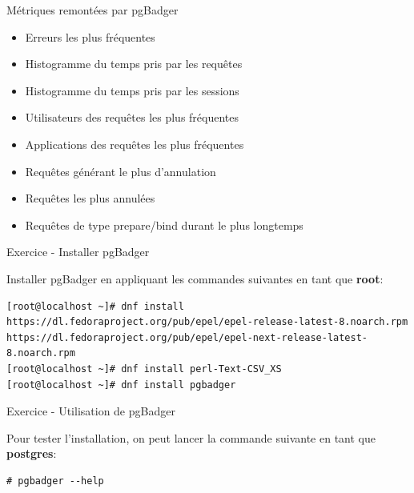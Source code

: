 
\begin{frame}{Métriques remontées par pgBadger}

   \begin{itemize}
      \item Erreurs les plus fréquentes
      \item Histogramme du temps pris par les requêtes
      \item Histogramme du temps pris par les sessions
      \item Utilisateurs des requêtes les plus fréquentes
      \item Applications des requêtes les plus fréquentes
      \item Requêtes générant le plus d'annulation
      \item Requêtes les plus annulées
      \item Requêtes de type prepare/bind durant le plus longtemps
   \end{itemize}

\end{frame}


\begin{frame}[fragile]{Exercice - Installer pgBadger}

   Installer pgBadger en appliquant les commandes suivantes en tant que \textbf{root}:


\begin{tiny}
\begin{Verbatim}[commandchars=\\\{\}]
[root@localhost ~]# dnf install https://dl.fedoraproject.org/pub/epel/epel-release-latest-8.noarch.rpm https://dl.fedoraproject.org/pub/epel/epel-next-release-latest-8.noarch.rpm
[root@localhost ~]# dnf install perl-Text-CSV_XS
[root@localhost ~]# dnf install pgbadger
\end{Verbatim}
\end{tiny}

\end{frame}


\begin{frame}[fragile]{Exercice - Utilisation de pgBadger}

Pour tester l'installation, on peut lancer la commande suivante en tant que \textbf{postgres}:

\begin{tiny}
\begin{Verbatim}[commandchars=\\\{\}]
# pgbadger --help
\end{Verbatim}
\end{tiny}

\end{frame}

